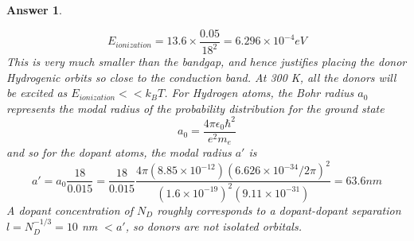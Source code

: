 \documentclass[a4paper]{article}
\newtheorem{ans}{Answer}[subsection]
\theoremstyle{new}
\begin{document}
\begin{ans}
\begin{enumerate}[label=(\roman*)]
$$E_{ionization}=13.6\times\frac{0.05}{18^2}=6.296\times10^{-4}eV$$
This is very much smaller than the bandgap, and hence justifies placing the donor Hydrogenic orbits so close to the conduction band. At 300 K, all the donors will be excited as $E_{ionization}<<k_BT$. For Hydrogen atoms, the Bohr radius $a_0$ represents the modal radius of the probability distribution for the ground state
$$a_0=\frac{4\pi\epsilon_0\hbar^2}{e^2m_e}$$
and so for the dopant atoms, the modal radius $a'$ is
$$a'=a_0\frac{18}{0.015}=\frac{18}{0.015}\frac{4\pi(8.85\times10^{-12})(6.626\times10^{-34}/2\pi)^2}{(1.6\times10^{-19})^2(9.11\times10^{-31})}=63.6nm$$
A dopant concentration of $N_D$ roughly corresponds to a dopant-dopant separation $l=N_D^{-1/3}=10$ nm $<a'$, so donors are not isolated orbitals.
\end{enumerate}
\end{ans}
\end{document}
